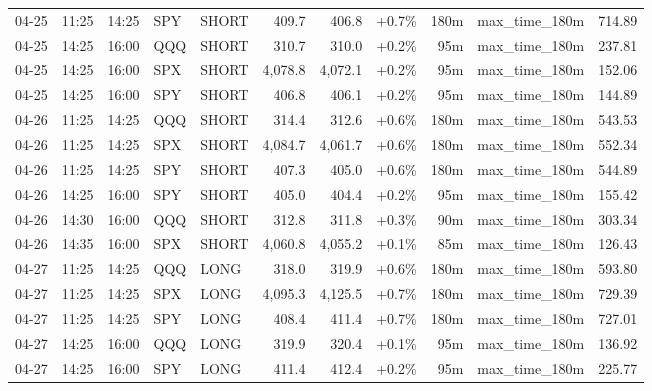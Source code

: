 \documentclass[11pt,a4paper,twoside]{article}
\begin{document}
\begin{center}
\begin{longtable}{>{\color{txtmain}}l l l l l r r r r >{\color{txtmain}}l r}
04-25 & 11:25 & 14:25 & SPY & SHORT & 409.7 & 406.8 & \textcolor{wingreen}{+0.7\%} & 180m & max\_time\_180m & \textcolor{wingreen}{714.89} \\
04-25 & 14:25 & 16:00 & QQQ & SHORT & 310.7 & 310.0 & \textcolor{wingreen}{+0.2\%} & 95m & max\_time\_180m & \textcolor{wingreen}{237.81} \\
04-25 & 14:25 & 16:00 & SPX & SHORT & 4,078.8 & 4,072.1 & \textcolor{wingreen}{+0.2\%} & 95m & max\_time\_180m & \textcolor{wingreen}{152.06} \\
04-25 & 14:25 & 16:00 & SPY & SHORT & 406.8 & 406.1 & \textcolor{wingreen}{+0.2\%} & 95m & max\_time\_180m & \textcolor{wingreen}{144.89} \\
04-26 & 11:25 & 14:25 & QQQ & SHORT & 314.4 & 312.6 & \textcolor{wingreen}{+0.6\%} & 180m & max\_time\_180m & \textcolor{wingreen}{543.53} \\
04-26 & 11:25 & 14:25 & SPX & SHORT & 4,084.7 & 4,061.7 & \textcolor{wingreen}{+0.6\%} & 180m & max\_time\_180m & \textcolor{wingreen}{552.34} \\
04-26 & 11:25 & 14:25 & SPY & SHORT & 407.3 & 405.0 & \textcolor{wingreen}{+0.6\%} & 180m & max\_time\_180m & \textcolor{wingreen}{544.89} \\
04-26 & 14:25 & 16:00 & SPY & SHORT & 405.0 & 404.4 & \textcolor{wingreen}{+0.2\%} & 95m & max\_time\_180m & \textcolor{wingreen}{155.42} \\
04-26 & 14:30 & 16:00 & QQQ & SHORT & 312.8 & 311.8 & \textcolor{wingreen}{+0.3\%} & 90m & max\_time\_180m & \textcolor{wingreen}{303.34} \\
04-26 & 14:35 & 16:00 & SPX & SHORT & 4,060.8 & 4,055.2 & \textcolor{wingreen}{+0.1\%} & 85m & max\_time\_180m & \textcolor{wingreen}{126.43} \\
04-27 & 11:25 & 14:25 & QQQ & LONG & 318.0 & 319.9 & \textcolor{wingreen}{+0.6\%} & 180m & max\_time\_180m & \textcolor{wingreen}{593.80} \\
04-27 & 11:25 & 14:25 & SPX & LONG & 4,095.3 & 4,125.5 & \textcolor{wingreen}{+0.7\%} & 180m & max\_time\_180m & \textcolor{wingreen}{729.39} \\
04-27 & 11:25 & 14:25 & SPY & LONG & 408.4 & 411.4 & \textcolor{wingreen}{+0.7\%} & 180m & max\_time\_180m & \textcolor{wingreen}{727.01} \\
04-27 & 14:25 & 16:00 & QQQ & LONG & 319.9 & 320.4 & \textcolor{wingreen}{+0.1\%} & 95m & max\_time\_180m & \textcolor{wingreen}{136.92} \\
04-27 & 14:25 & 16:00 & SPY & LONG & 411.4 & 412.4 & \textcolor{wingreen}{+0.2\%} & 95m & max\_time\_180m & \textcolor{wingreen}{225.77} \\

\end{longtable}
\end{center}
\end{document}

